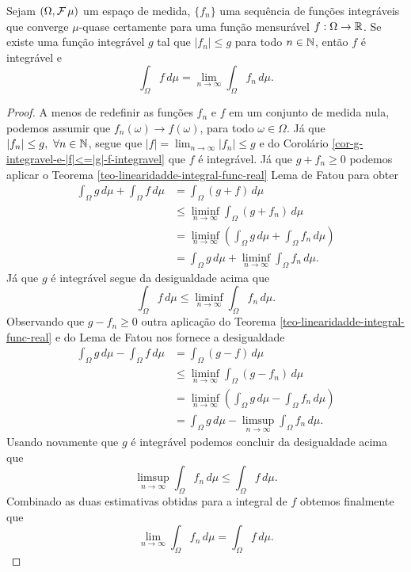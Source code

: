 \begin{teorema}
\label{Teo-Convergencia-Dominada}
Sejam $(\Omega,\mathcal{F}\,\mu)$ um espaço de medida,
$\{f_n\}$ uma sequência de funções integráveis 
que converge $\mu$-quase certamente para uma função
mensurável $f:\Omega\to\mathbb{R}$. Se existe uma função 
integrável $g$ tal que $|f_n|\leq g$ para todo
$n\in\mathbb{N}$, então $f$ é integrável e 
	\[
		\int_{\Omega} f\, d\mu 
		=
		\lim_{n\to\infty} \int_{\Omega} f_n\, d\mu.
	\]
\end{teorema}



\begin{proof}
A menos de redefinir as funções $f_n$ e $f$ em 
um conjunto de medida nula, podemos assumir que 
$f_n(\omega)\to f(\omega)$, para todo $\omega\in\Omega$.
Já que $|f_n|\leq g,\ \forall n\in\mathbb{N}$, segue que 
$|f|=\lim_{n\to\infty}|f_n|\leq g$ e do Corolário 
\ref{cor-g-integravel-e-|f|<=|g|-f-integravel}
que $f$ é integrável. Já que $g+f_n\geq 0$
podemos aplicar o 
Teorema \ref{teo-linearidadde-integral-func-real}
Lema de Fatou para obter
\begin{align*}
	\int_{\Omega} g\, d\mu + \int_{\Omega} f\, d\mu 
	&=
	\int_{\Omega} (g+f)\, d\mu 
	\\
	&\leq 
	\liminf_{n\to\infty}\int_{\Omega} (g+f_n)\, d\mu 
	\\
	&=
	\liminf_{n\to\infty}
	\left( 
		\int_{\Omega} g\, d\mu 
		+
		\int_{\Omega} f_n\, d\mu 
	\right)
	\\
	&=
	\int_{\Omega} g\, d\mu 
	+
	\liminf_{n\to\infty}\int_{\Omega} f_n\, d\mu.
\end{align*}
Já que $g$ é integrável segue da desigualdade 
acima que 	
	\[
	\int_{\Omega} f\, d\mu
	\leq	
	\liminf_{n\to\infty}\int_{\Omega} f_n\, d\mu.
	\]
Observando que $g-f_n\geq 0$ outra aplicação do 
Teorema \ref{teo-linearidadde-integral-func-real} 
e do Lema de Fatou nos fornece a desigualdade
\begin{align*}
	\int_{\Omega} g\, d\mu - \int_{\Omega} f\, d\mu 
	&=
	\int_{\Omega} (g-f)\, d\mu 
	\\
	&\leq 
	\liminf_{n\to\infty}\int_{\Omega} (g-f_n)\, d\mu 
	\\
	&=
	\liminf_{n\to\infty}
	\left( 
		\int_{\Omega} g\, d\mu 
		-
		\int_{\Omega} f_n\, d\mu 
	\right)
	\\
	&=
	\int_{\Omega} g\, d\mu 
	-
	\limsup_{n\to\infty}\int_{\Omega} f_n\, d\mu.
\end{align*}
Usando novamente que $g$ é integrável podemos 
concluir da desigualdade acima que 
	\[
	\limsup_{n\to\infty}\int_{\Omega} f_n\, d\mu
	\leq	
	\int_{\Omega} f\, d\mu.
	\]
Combinado as duas estimativas obtidas para a
integral de $f$ obtemos finalmente que 
	\[
	\lim_{n\to\infty}\int_{\Omega} f_n\, d\mu
	=	
	\int_{\Omega} f\, d\mu.
	\]
\end{proof}